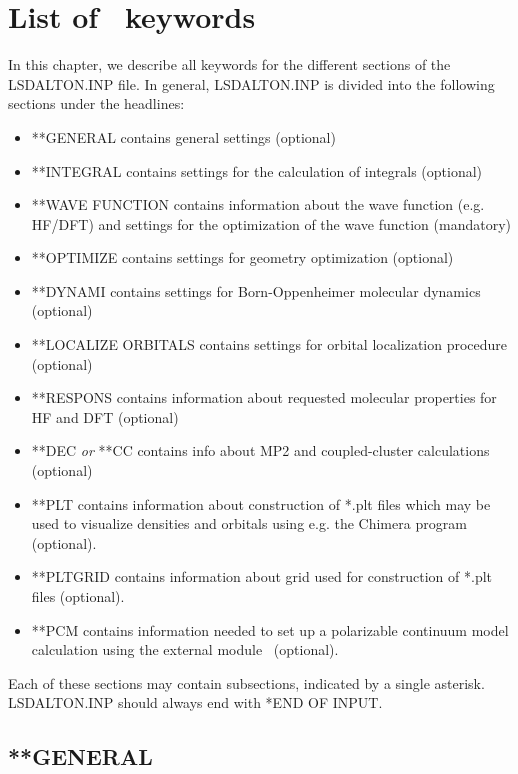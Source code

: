 
\chapter{List of \lsdalton\ keywords}\label{ch:keywords}

In this chapter, we describe all keywords for the different sections
of the LSDALTON.INP file. In general, LSDALTON.INP is divided into the following sections under
the headlines:
\begin{itemize}
\item **GENERAL contains general settings (optional)
\item **INTEGRAL contains settings for the calculation of integrals (optional)
\item **WAVE FUNCTION contains information about the wave function (e.g. HF/DFT) and settings
for the optimization of the wave function (mandatory)
\item **OPTIMIZE contains settings for geometry optimization (optional)
\item **DYNAMI contains settings for Born-Oppenheimer molecular dynamics (optional)
\item **LOCALIZE ORBITALS contains settings for orbital localization procedure (optional)
\item **RESPONS contains information about requested molecular properties for HF and DFT (optional)
\item **DEC \emph{or} **CC contains info about MP2 and coupled-cluster calculations (optional)
\item **PLT contains information about construction of *.plt files which may be used to visualize densities and orbitals using e.g. the Chimera program~\cite{chimera} (optional).
\item **PLTGRID contains information about grid used for construction of *.plt files (optional).
\item **PCM contains information needed to set up a polarizable continuum model calculation using the \pcm external module~\cite{PCMSolver} (optional).
\end{itemize}
Each of these sections may contain subsections, indicated by a single asterisk. LSDALTON.INP
should always end with *END OF INPUT. 

\section{**GENERAL}\label{sec:general}

